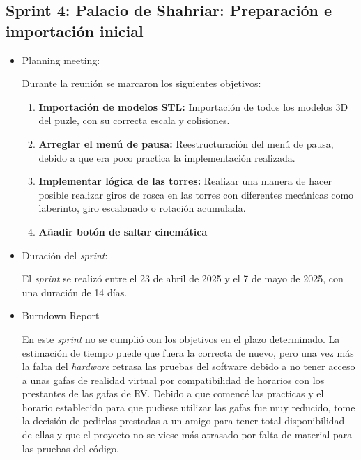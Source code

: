 \subsection{\textbf{Sprint 4: Palacio de Shahriar: Preparación e importación inicial } }
\begin{itemize}
    \item {Planning meeting:}
    
Durante la reunión se marcaron los siguientes objetivos:
\begin{enumerate}
  \item \textbf{Importación de modelos STL:} Importación de todos los modelos 3D del puzle, con su correcta escala y colisiones. 

  \item \textbf{Arreglar el menú de pausa:} Reestructuración del menú de pausa, debido a que era poco practica la implementación realizada.  

  \item \textbf{Implementar lógica de las torres:}  Realizar una manera de hacer posible realizar giros de rosca en las torres con diferentes mecánicas como laberinto, giro escalonado o rotación acumulada.

  \item \textbf{Añadir botón de saltar cinemática}

\end{enumerate}
    \item {Duración del \textit{sprint}:}
    
El \textit{sprint} se realizó entre el 23 de abril de 2025 y el 7 de mayo de 2025, con una duración de 14 días.
    \item {Burndown Report}
    
En este \textit{sprint} no se cumplió con los objetivos en el plazo determinado. La estimación de tiempo puede que fuera la correcta de nuevo, pero una vez más la falta del \textit{hardware} retrasa las pruebas del software debido a no tener acceso a unas gafas de realidad virtual por compatibilidad de horarios con los prestantes de las gafas de RV. Debido a que comencé las practicas y el horario establecido para que pudiese utilizar las gafas fue muy reducido, tome la decisión de pedirlas prestadas a un amigo para tener total disponibilidad de ellas y que el proyecto no se viese más atrasado por falta de material para las pruebas del código. 

\end{itemize}

